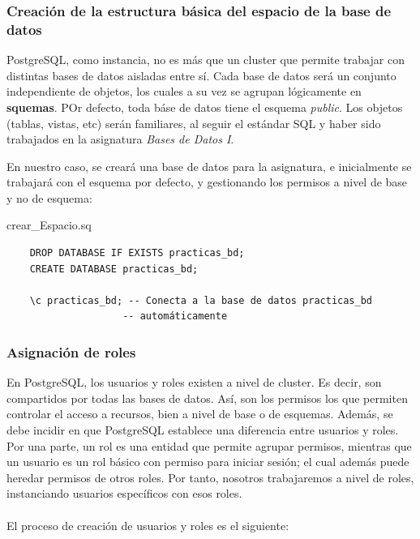 \documentclass{article}
\begin{document}
\subsubsection{Creación de la estructura básica del espacio de la base de datos}

PostgreSQL, como instancia, no es más que un cluster que permite trabajar con distintas bases de datos aisladas entre sí. Cada base de datos será un conjunto independiente de objetos, los cuales a su vez se agrupan lógicamente en \textbf{squemas}. POr defecto, toda báse de datos tiene el esquema \textit{public}. Los objetos (tablas, vistas, etc) serán familiares, al seguir el estándar SQL y haber sido trabajados en la asignatura \textit{Bases de Datos I}.

En nuestro caso, se creará una base de datos para la asignatura, e inicialmente se trabajará con el esquema por defecto, y gestionando los permisos a nivel de base y no de esquema:
\begin{scriptbox}{crear\_Espacio.sq}
\begin{verbatim}
    DROP DATABASE IF EXISTS practicas_bd;
    CREATE DATABASE practicas_bd;

    \c practicas_bd; -- Conecta a la base de datos practicas_bd 
                    -- automáticamente
\end{verbatim}
\end{scriptbox}

\subsubsection{Asignación de roles}

En PostgreSQL, los usuarios y roles existen a nivel de cluster. Es decir, son compartidos por todas las bases de datos. Así, son los permisos los que permiten controlar el acceso a recursos, bien a nivel de base o de esquemas.
Además, se debe incidir en que PostgreSQL establece una diferencia entre usuarios y roles. Por una parte, un rol es una entidad que permite agrupar permisos, mientras que un usuario es un rol básico con permiso para iniciar sesión; el cual además puede heredar permisos de otros roles. Por tanto, nosotros trabajaremos a nivel de roles, instanciando usuarios específicos con esos roles.
 \\  \\
El proceso de creación de usuarios y roles es el siguiente:
\end{document}
